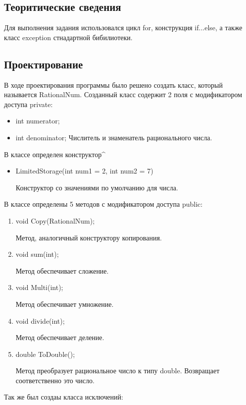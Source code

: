 \documentclass[12pt,a4paper]{report}
\begin{document}
\subsection{Теоритические сведения}

Для выполнения задания использовался цикл for, конструкция if...else, а также класс exception стнадартной бибилиотеки.

\subsection{Проектирование}


В ходе проектирования программы было решено создать класс, который называется RationalNum.
Созданный класс содержит 2 поля с модификатором доступа private:

\begin{itemize}
	\item  int numerator;
    \item  int denominator;
    Числитель и знаменатель рационального числа.
\end{itemize}
	
	В классе определен конструктор^
\begin{itemize}

	\item LimitedStorage(int num1 = 2, int num2 = 7)
	
	Конструктор со значениями по умолчанию для числа. 
	
			
\end{itemize}	
В классе определены 5 методов с модификатором доступа public:		

\begin{enumerate}	
	\item void Copy(RationalNum);
	
	Метод, аналогичный конструктору копирования.
	
	\item void sum(int);
	
	Метод обеспечивает сложение. 
	
	\item void Multi(int);
	
	Метод обеспечивает умножение.
	
	\item void divide(int);
	
	Метод обеспечивает деление.
	
	\item double ToDouble();
	
	Метод преобразует рациональное число к типу double. Возвращает соответственно это число.
	
	

\end{enumerate}
	Так же был создаы класса исключений:
	
\end{document}
